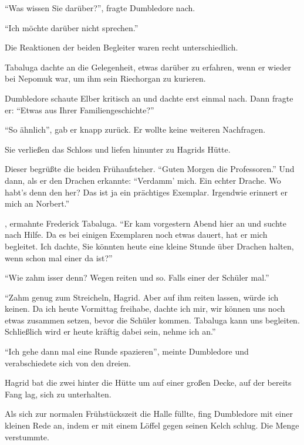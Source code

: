 \enquote{Was wissen Sie darüber?}, fragte Dumbledore nach.

\enquote{Ich möchte darüber nicht sprechen.}

Die Reaktionen der beiden Begleiter waren recht unterschiedlich.

Tabaluga dachte an die Gelegenheit, etwas darüber zu erfahren, wenn er wieder bei Nepomuk war, um ihm sein Riechorgan zu kurieren.

Dumbledore schaute Elber kritisch an und dachte erst einmal nach. Dann fragte er: \enquote{Etwas aus Ihrer Familiengeschichte?}

\enquote{So ähnlich}, gab er knapp zurück. Er wollte keine weiteren Nachfragen.

Sie verließen das Schloss und liefen hinunter zu Hagrids Hütte.

Dieser begrüßte die beiden Frühaufsteher. \enquote{Guten Morgen die Professoren.} Und dann, als er den Drachen erkannte: \enquote{Verdamm’ mich. Ein echter Drache. Wo habt’s denn den her? Das ist ja ein prächtiges Exemplar. Irgendwie erinnert er mich an Norbert.}

, ermahnte Frederick Tabaluga. \enquote{Er kam vorgestern Abend hier an und suchte nach Hilfe. Da es bei einigen Exemplaren noch etwas dauert, hat er mich begleitet. Ich dachte, Sie könnten heute eine kleine Stunde über Drachen halten, wenn schon mal einer da ist?}

\enquote{Wie zahm isser denn? Wegen reiten und so. Falls einer der Schüler mal.}


\enquote{Zahm genug zum Streicheln, Hagrid. Aber auf ihm reiten lassen, würde ich keinen. Da ich heute Vormittag freihabe, dachte ich mir, wir können uns noch etwas zusammen setzen, bevor die Schüler kommen. Tabaluga kann uns begleiten. Schließlich wird er heute kräftig dabei sein, nehme ich an.}

\enquote{Ich gehe dann mal eine Runde spazieren}, meinte Dumbledore und verabschiedete sich von den dreien.

Hagrid bat die zwei hinter die Hütte um auf einer großen Decke, auf der bereits Fang lag, sich zu unterhalten.

Als sich zur normalen Frühstückszeit die Halle füllte, fing Dumbledore mit einer kleinen Rede an, indem er mit einem Löffel gegen seinen Kelch schlug. Die Menge verstummte.

